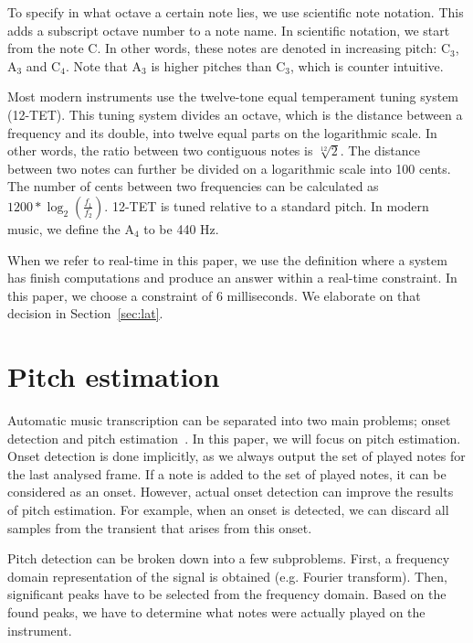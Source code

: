 \documentclass[10pt,twocolumn]{article}
\begin{document}
To specify in what octave a certain note lies, we use scientific note notation. This adds a subscript octave number to a note name. In scientific notation, we start from the note C. In other words, these notes are denoted in increasing pitch: $\text{C}_3$, $\text{A}_3$ and $\text{C}_4$. Note that $\text{A}_3$ is higher pitches than $\text{C}_3$, which is counter intuitive.

Most modern instruments use the twelve-tone equal temperament tuning system (12-TET). This tuning system divides an octave, which is the distance between a frequency and its double, into twelve equal parts on the logarithmic scale. In other words, the ratio between two contiguous notes is $\sqrt[12]{2}$. The distance between two notes can further be divided on a logarithmic scale into 100 cents. The number of cents between two frequencies can be calculated as $1200 * \log_2(\frac{f_1}{f_2})$. 12-TET is tuned relative to a standard pitch. In modern music, we define the $\text{A}_4$ to be 440 Hz.

When we refer to real-time in this paper, we use the definition where a system has finish computations and produce an answer within a real-time constraint. In this paper, we choose a constraint of 6 milliseconds. We elaborate on that decision in Section~\ref{sec:lat}.


\section{Pitch estimation}
Automatic music transcription can be separated into two main problems; onset detection and pitch estimation~\cite{survey2}. In this paper, we will focus on pitch estimation. Onset detection is done implicitly, as we always output the set of played notes for the last analysed frame. If a note is added to the set of played notes, it can be considered as an onset. However, actual onset detection can improve the results of pitch estimation. For example, when an onset is detected, we can discard all samples from the transient that arises from this onset.

Pitch detection can be broken down into a few subproblems. First, a frequency domain representation of the signal is obtained (e.g. Fourier transform). Then, significant peaks have to be selected from the frequency domain. Based on the found peaks, we have to determine what notes were actually played on the instrument.
\end{document}
